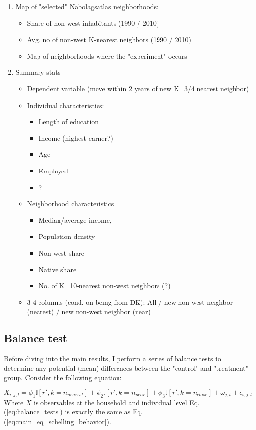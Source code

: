 \documentclass[main.tex]{subfiles}
\begin{document}
\begin{enumerate}
    \item Map of "selected" \href{nabolagstlas.dk}{Nabolagsatlas} neighborhoods:
    \begin{itemize}
        \item Share of non-west inhabitants (1990 / 2010)
        \item Avg. no of non-west K-nearest neighbors (1990 / 2010) 
        \item Map of neighborhoods where the "experiment" occurs
    \end{itemize}
    \item Summary stats
    \begin{itemize}
        \item Dependent variable (move within 2 years of new K=3/4 nearest neighbor)
        \item Individual characteristics:
        \begin{itemize}
            \item Length of education
            \item Income (highest earner?)
            \item Age
            \item Employed
            \item ?
        \end{itemize}
        \item Neighborhood characteristics
        \begin{itemize}
            \item Median/average income,
            \item Population density
            \item Non-west share
            \item Native share
            \item No. of K=10-nearest non-west neighbors (?)
        \end{itemize}
        \item 3-4 columns (cond. on being from DK): All / new non-west neighbor (nearest) / new non-west neighbor (near)
    \end{itemize}
\end{enumerate}

\subsection{Balance test}

Before diving into the main results, I perform a series of balance tests to determine any potential (mean) differences between the "control" and "treatment" group. Consider the following equation:

\begin{equation}
    X_{i, j, t} = \phi_1 \mathbb{I}[r', k=n_{nearest}] + \phi_2 \mathbb{I}[r', k = n_{near}] + \phi_3 \mathbb{I}[r', k = n_{close}] + \omega_{j, t} + \epsilon_{i, j, t} 
    \label{eq:balance_tests}
\end{equation}
Where $X$ is observables at the household and individual level Eq. (\ref{eq:balance_tests}) is exactly the same as Eq. (\ref{eq:main_eq_schelling_behavior}). 
\end{document}

